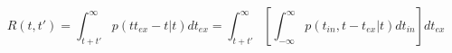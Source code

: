 \begin{equation}
R(t,t') = \int_{t+t'}^\infty p(tt_{ex}-t|t) dt_{ex}  = \int_{t+t'}^\infty \left[ \int_{-\infty}^\infty p(t_{in},t-t_{ex}|t) dt_{in} \right]  dt_{ex}
\end{equation}